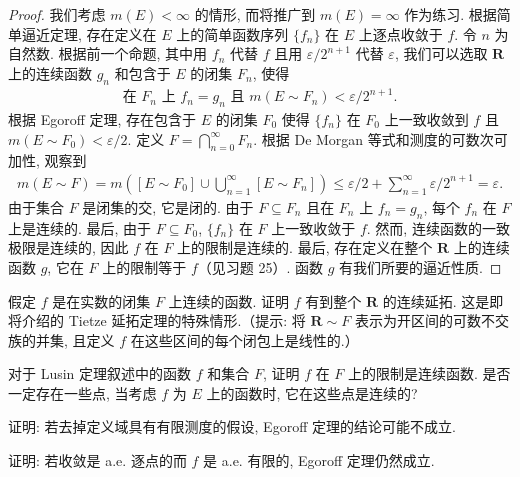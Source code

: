 \documentclass[../../main.tex]{subfiles}
\begin{document}
\begin{proof}
我们考虑 $m(E)<\infty$ 的情形, 而将推广到 $m(E)=\infty$ 作为练习. 根据简单逼近定理, 存在定义在 $E$ 上的简单函数序列 $\{f_{n}\}$ 在 $E$ 上逐点收敛于 $f$. 令 $n$ 为自然数. 根据前一个命题, 其中用 $f_{n}$ 代替 $f$ 且用 $\varepsilon/2^{n+1}$ 代替 $\varepsilon$, 我们可以选取 $\mathbf{R}$ 上的连续函数 $g_{n}$ 和包含于 $E$ 的闭集 $F_{n}$, 使得
\begin{align*}
\text{在 }F_{n}\text{ 上 }f_{n}=g_{n}\text{ 且 }m(E\sim F_{n})<\varepsilon/2^{n+1}.
\end{align*}
根据 Egoroff 定理, 存在包含于 $E$ 的闭集 $F_{0}$ 使得 $\{f_{n}\}$ 在 $F_{0}$ 上一致收敛到 $f$ 且 $m(E\sim F_{0})<\varepsilon/2$. 定义 $F=\bigcap_{n=0}^{\infty}F_{n}$. 根据 De Morgan 等式和测度的可数次可加性, 观察到
\begin{align*}
m(E\sim F)=m\left([E\sim F_{0}]\cup\bigcup_{n=1}^{\infty}[E\sim F_{n}]\right)\leqslant\varepsilon/2+\sum_{n=1}^{\infty}\varepsilon/2^{n+1}=\varepsilon.
\end{align*}
由于集合 $F$ 是闭集的交, 它是闭的. 由于 $F\subseteq F_{n}$ 且在 $F_{n}$ 上 $f_{n}=g_{n}$, 每个 $f_{n}$ 在 $F$ 上是连续的. 最后, 由于 $F\subseteq F_{0}$, $\{f_{n}\}$ 在 $F$ 上一致收敛于 $f$. 然而, 连续函数的一致极限是连续的, 因此 $f$ 在 $F$ 上的限制是连续的. 最后, 存在定义在整个 $\mathbf{R}$ 上的连续函数 $g$, 它在 $F$ 上的限制等于 $f$（见习题 25）. 函数 $g$ 有我们所要的逼近性质.
\end{proof}

\begin{exercise}\label{exercise:ch03-25}
假定 $f$ 是在实数的闭集 $F$ 上连续的函数. 证明 $f$ 有到整个 $\mathbf{R}$ 的连续延拓. 这是即将介绍的 Tietze 延拓定理的特殊情形.（提示: 将 $\mathbf{R}\sim F$ 表示为开区间的可数不交族的并集, 且定义 $f$ 在这些区间的每个闭包上是线性的.）
\end{exercise}

\begin{exercise}\label{exercise:ch03-26}
对于 Lusin 定理叙述中的函数 $f$ 和集合 $F$, 证明 $f$ 在 $F$ 上的限制是连续函数. 是否一定存在一些点, 当考虑 $f$ 为 $E$ 上的函数时, 它在这些点是连续的?
\end{exercise}

\begin{exercise}\label{exercise:ch03-27}
证明: 若去掉定义域具有有限测度的假设, Egoroff 定理的结论可能不成立.
\end{exercise}

\begin{exercise}\label{exercise:ch03-28}
证明: 若收敛是 a.e. 逐点的而 $f$ 是 a.e. 有限的, Egoroff 定理仍然成立.
\end{exercise}
\end{document}

